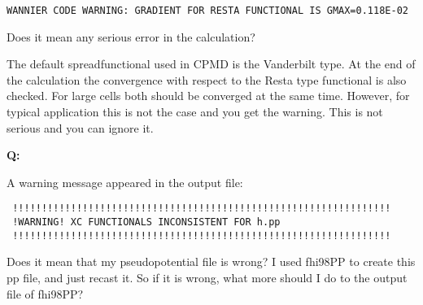 \documentclass[twoside,10pt,titlepage,a4paper]{article}
\newcommand{\reflabel}[1]{\hypertarget{#1}}
\newcommand{\reflabel}[1]{\label{#1}}
\newcommand{\faqquestion}[1]{\vspace{2ex}\reflabel{faq#1}{{\bf Q:\ }}}
\newcommand{\faqanswer}{\vspace{1ex}{{\bf A:\ }}}
\begin{document}
\begin{verbatim}
WANNIER CODE WARNING: GRADIENT FOR RESTA FUNCTIONAL IS GMAX=0.118E-02
\end{verbatim}
Does it mean any serious error in the calculation?

\faqanswer
The default spreadfunctional used in CPMD is the Vanderbilt type. At the
end of the calculation the convergence with respect to the Resta type
functional is also checked.  For large cells both should be converged at
the same time.  However, for typical application this is not the case
and you get the warning.  This is not serious and you can ignore it.

\faqquestion{xcpp}
A warning message appeared in the output file:
\begin{verbatim}
 !!!!!!!!!!!!!!!!!!!!!!!!!!!!!!!!!!!!!!!!!!!!!!!!!!!!!!!!!!!!!!!!!
 !WARNING! XC FUNCTIONALS INCONSISTENT FOR h.pp
 !!!!!!!!!!!!!!!!!!!!!!!!!!!!!!!!!!!!!!!!!!!!!!!!!!!!!!!!!!!!!!!!!
\end{verbatim}

Does it mean that my pseudopotential file is wrong? I used fhi98PP
to create this pp file, and just recast it. So if it is wrong, what
more should I do to the output file of fhi98PP?
\end{document}
